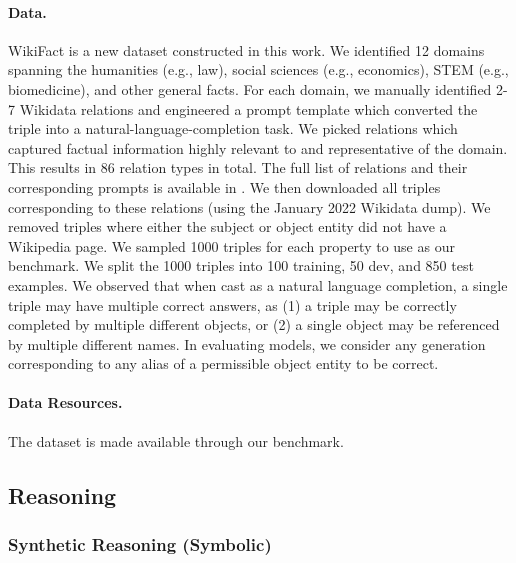 

\paragraph{Data.}
WikiFact is a new dataset constructed in this work.
We identified 12 domains spanning the humanities (e.g., law), social sciences (e.g., economics), STEM (e.g., biomedicine), and other general facts. 
For each domain, we manually identified 2-7 Wikidata relations and engineered a prompt template which converted the triple into a natural-language-completion task. 
We picked relations which captured factual information highly relevant to and representative of the domain. 
This results in 86 relation types in total. 
The full list of relations and their corresponding prompts is available in . 
We then downloaded all triples corresponding to these relations (using the January 2022 Wikidata dump). 
We removed triples where either the subject or object entity did not have a Wikipedia page. 
We sampled 1000 triples for each property to use as our benchmark. We split the 1000 triples into 100 training, 50 dev, and 850 test examples.
We observed that when cast as a natural language completion, a single triple may have multiple correct answers, as (1) a triple may be correctly completed by multiple different objects, or (2) a single object may be referenced by multiple different names. 
In evaluating models, we consider any generation corresponding to any alias of a permissible object entity to be correct.


\paragraph{Data Resources.}
The dataset is made available through our benchmark.






\subsection{Reasoning}
\label{app:component-reasoning}


\subsubsection{Synthetic Reasoning (Symbolic)}

